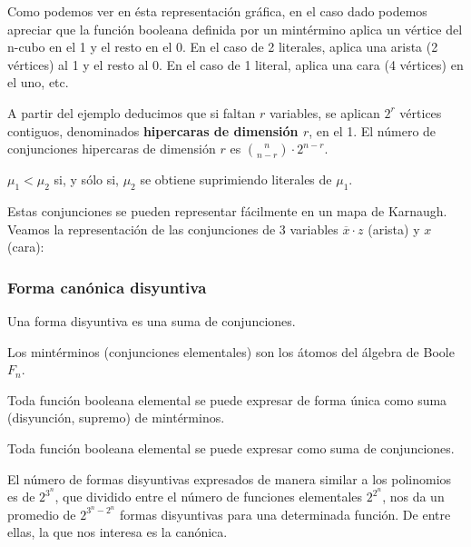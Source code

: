 \begin{ejemplo}[Visual]
    Como podemos ver en ésta representación gráfica, en el caso dado podemos apreciar que la función booleana definida por un mintérmino aplica un vértice del n-cubo en el 1 y el resto en el 0.
    En el caso de 2 literales, aplica una arista (2 vértices) al 1 y el resto al 0. En el caso de 1 literal, aplica una cara (4 vértices) en el uno, etc.
\end{ejemplo}

A partir del ejemplo deducimos que si faltan $r$ variables, se aplican $2^r$ vértices contiguos, denominados \textbf{hipercaras de dimensión $r$}, en el 1. El número de conjunciones
hipercaras de dimensión $r$ es $\binom{n}{n-r} \cdot 2^{n-r}$.
\begin{nota}
    $\mu_1 < \mu_2$ si, y sólo si, $\mu_2$ se obtiene suprimiendo literales de $\mu_1$.
\end{nota}

\begin{ejemplo}
    Estas conjunciones se pueden representar fácilmente en un mapa de Karnaugh. Veamos la representación de las conjunciones de 3 variables $\overline{x} \cdot z$ (arista) y $x$ (cara):
    \begin{center}
        \begin{Karnaugh_2x4}
        \end{Karnaugh_2x4}
    \end{center}
\end{ejemplo}

\subsubsection{Forma canónica disyuntiva}
\begin{ndef}
    Una forma disyuntiva es una suma de conjunciones.
\end{ndef}
\begin{nth}
    Los mintérminos (conjunciones elementales) son los átomos del álgebra de Boole $F_n$.
\end{nth}
\begin{nth}
    Toda función booleana elemental se puede expresar de forma única como suma (disyunción, supremo) de mintérminos.
\end{nth}
\begin{ncor}
    Toda función booleana elemental se puede expresar como suma de conjunciones.
\end{ncor}
El número de formas disyuntivas expresados de manera similar a los polinomios es de $2^{3^n}$, que dividido entre el número de funciones elementales $2^{2^n}$, nos da un promedio de $2^{3^n-2^n}$ formas disyuntivas para una determinada función.
De entre ellas, la que nos interesa es la canónica.

